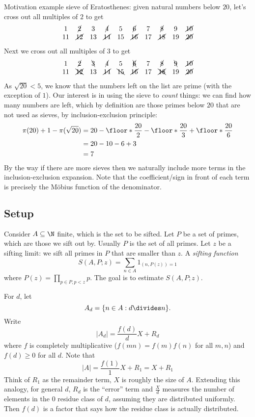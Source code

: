 \documentclass[a4paper]{article}
\begin{document}
Motivation example sieve of Eratosthenes: given natural numbers below \(20\), let's cross out all multiples of \(2\) to get
\[
  \begin{array}{cccccccccc}
    1 & \cancel 2 & 3 & \cancel 4 & 5 & \cancel 6 & 7 & \cancel 8 & 9 & \cancel{10} \\
    11 & \cancel{12} & 13 & \cancel{14} & 15 & \cancel{16} & 17 & \cancel{18} & 19 & \cancel{20}
  \end{array}
\]
Next we cross out all multiples of \(3\) to get
\[
  \begin{array}{cccccccccc}
    1 & \cancel 2 & \bcancel 3 & \cancel 4 & 5 & \xcancel 6 & 7 & \cancel 8 & \bcancel 9 & \cancel{10} \\
    11 & \xcancel{12} & 13 & \cancel{14} & \bcancel{15} & \cancel{16} & 17 & \xcancel{18} & 19 & \cancel{20}
  \end{array}
\]
As \(\sqrt{20} < 5\), we know that the numbers left on the list are prime (with the exception of \(1\)). Our interest is in using the sieve to \emph{count} things: we can find how many numbers are left, which by definition are those primes below \(20\) that are not used as sieves, by inclusion-exclusion principle:
\begin{align*}
  \pi(20) + 1 - \pi(\sqrt{20})
  &= 20 - \floor*{\frac{20}{2}} - \floor*{\frac{20}{3}} + \floor*{\frac{20}{6}} \\
  &= 20 - 10 - 6 + 3 \\
  &= 7 
\end{align*}
By the way if there are more sieves then we naturally include more terms in the inclusion-exclusion expansion. Note that the coefficient/sign in front of each term is precisely the Möbius function of the denominator.

\subsection{Setup}

Consider \(A \subseteq \N\) finite, which is the set to be sifted. Let \(P\) be a set of primes, which are those we sift out by. Usually \(P\) is the set of all primes. Let \(z\) be a sifting limit: we sift all primes in \(P\) that are smaller than \(z\). A \emph{sifting function}
\[
  S(A, P; z) = \sum_{n \in A} 1_{(n, P(z)) = 1}
\]
where \(P(z) = \prod_{p \in P, p < z} p\). The goal is to estimate \(S(A, P; z)\).

For \(d\), let
\[
  A_d = \{n \in A: d \divides n\}.
\]
Write
\[
  |A_d| = \frac{f(d)}{d} X + R_d
\]
where \(f\) is completely multiplicative (\(f(mn) = f(m)f(n)\) for all \(m, n\)) and \(f(d) \geq 0\) for all \(d\). Note that
\[
  |A| = \frac{f(1)}{1} X + R_1 = X + R_1
\]
Think of \(R_1\) as the remainder term, \(X\) is roughly the size of \(A\). Extending this analogy, for general \(d\), \(R_d\) is the ``error'' term and \(\frac{X}{d}\) measures the number of elements in the \(0\) residue class of \(d\), assuming they are distributed uniformly. Then \(f(d)\) is a factor that says how the residue class is actually distributed.
\end{document}
